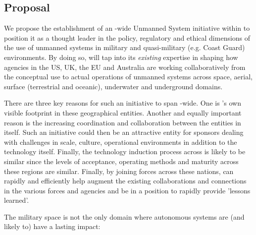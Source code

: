 \documentclass[11pt,letterpaper]{article}
\begin{document}
\subsection{Proposal}

We propose the establishment of an \auke-wide Unmanned System
initiative within \org to position it as a thought leader in the
policy, regulatory and ethical dimensions of the use of unmanned
systems in military and quasi-military (e.g. Coast Guard)
environments. By doing so, \org will tap into its \emph{existing}
expertise in shaping how agencies in the US, UK, the EU and Australia
are working collaboratively from the conceptual use to actual
operations of unmanned systems across space, aerial, surface
(terrestrial and oceanic), underwater and underground domains.

There are three key reasons for such an initiative to span \auke-wide.
One is \orge's own visible footprint in these geographical
entities. Another and equally important reason is the increasing
coordination and collaboration between the entities in \auk
itself. Such an initiative could then be an attractive entity for
sponsors dealing with challenges in scale, culture, operational
environments in addition to the technology itself.  Finally, the
technology induction process across \auk is likely to be similar since
the levels of acceptance, operating methods and maturity across these
regions are similar. Finally, by joining forces across these nations,
\org can rapidly and efficiently help augment the existing
collaborations and connections in the various forces and agencies and
be in a position to rapidly provide 'lessons learned'.

The military space is not the only domain where autonomous systems are
(and likely to) have a lasting impact:
\end{document}
